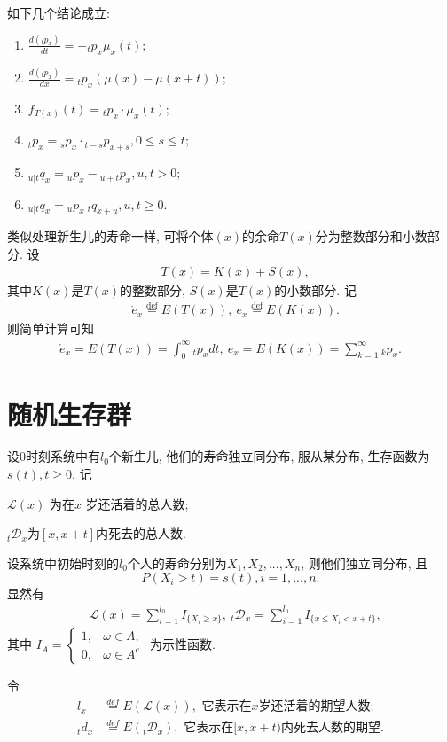 \documentclass[lang=cn,10pt]{elegantbook}
\begin{document}
\begin{corollary}
如下几个结论成立:
\begin{enumerate}
	\item $\frac{d(_tp_x)}{dt}=-_tp_x\mu_x(t);$
	\item $\frac{d(_tp_x)}{dx}= {}_tp_x(\mu(x)-\mu(x+t));$
	\item $f_{T(x)}(t)={}_tp_x\cdot \mu_x(t);$
    \item $_tp_x={}_sp_x\cdot{}_{t-s}p_{x+s},0\leq s\leq t;$
	\item ${}_{u|t}q_x={}_up_x-{}_{u+t}p_x, u,t>0;$
	\item ${}_{u|t}q_x={}_up_x~{}_{t}q_{x+u},u,t\ge0.$
\end{enumerate}
\end{corollary}

\begin{definition}[个体$(x)$的整数与分数余命及期望]
	类似处理新生儿的寿命一样, 可将个体$(x)$的余命$T(x)$分为整数部分和小数部分.
设
\begin{align*}
     & T(x)=K(x)+S(x),
\end{align*}
其中$K(x)$是$T(x)$的整数部分, $S(x)$是$T(x)$的小数部分. 记
\begin{align*}
     & \mathring{e}_x\stackrel{\text{def}}{=}E(T(x)), \   {e_x}\stackrel{\text{def}}{=}E(K(x)).
\end{align*}
则简单计算可知 \begin{align*}
    \mathring{e}_x =E(T(x))=\int_{0}^{\infty}{_tp_xdt}, ~
    {e_x}          =E(K(x))=\sum_{k=1}^{\infty}{_kp_x}.
\end{align*}
\end{definition}

\section{随机生存群}
\begin{definition}[模型描述]
	设0时刻系统中有$l_0$个新生儿, 他们的寿命独立同分布, 服从某分布, 生存函数为$s(t),t\ge 0.$  记

$\mathscr{L}(x)$ 为在$x$ 岁还活着的总人数;

$_t \mathscr{D}_x$为$[x,x+t]$内死去的总人数.

设系统中初始时刻的$l_0$个人的寿命分别为$X_1,X_2,...,X_n$, 则他们独立同分布, 且
$$P(X_i>t)=s(t), i=1,...,n.$$
显然有
\begin{align*}
     & \mathscr{L}(x)=\sum_{i=1}^{l_0}I_{\{X_{i}\geqslant x\}},\ {}_t\mathscr{D}_x=\sum_{i=1}^{l_0}I_{\{ x\leqslant X_i<x+t\}},
\end{align*}
其中
$
    I_{A}=\left\{\begin{array}{ll}1,&\omega\in A,\\0,&\omega\in A^c\end{array}\right.
$ 为示性函数.

令 \begin{align*}
    l_x     & \overset{def}{=}E(\mathscr L(x)), \text{ 它表示在}x\text{岁还活着的期望人数};         \\
    {}_td_x & \overset{def}{=}E({}_t\mathscr D_x ),\text{ 它表示在}[x,x+t)\text{内死去人数的期望}.
\end{align*}
\end{definition}
\end{document}
